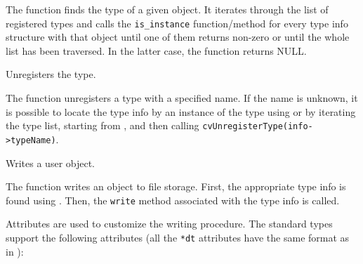 
\begin{description}
\end{description}

The function finds the type of a given object. It iterates
through the list of registered types and calls the \texttt{is\_instance}
function/method for every type info structure with that object until one
of them returns non-zero or until the whole list has been traversed. In
the latter case, the function returns NULL.

Unregisters the type.


\begin{description}
\end{description}

The function unregisters a type with
a specified name. If the name is unknown, it is possible to locate
the type info by an instance of the type using  or by
iterating the type list, starting from , and then calling
\texttt{cvUnregisterType(info->typeName)}.

Writes a user object.


\begin{description}
\end{description}

The function writes an object to file storage. First, the appropriate type info is found using . Then, the \texttt{write} method associated with the type info is called.

Attributes are used to customize the writing procedure. The standard types support the following attributes (all the \texttt{*dt} attributes have the same format as in ):

